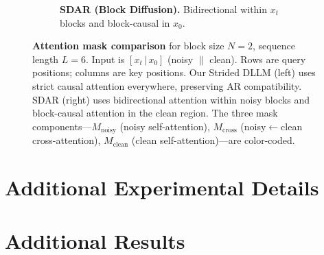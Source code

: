 \begin{figure}[t]
\begin{subfigure}[t]{0.48\textwidth}
\caption{\textbf{SDAR (Block Diffusion).} Bidirectional within $x_t$ blocks and block-causal in $x_0$.}
\label{fig:attn_mask_sdar}
\end{subfigure}
\caption{\textbf{Attention mask comparison} for block size $N{=}2$, sequence length $L{=}6$. Input is $[x_t \,|\, x_0]$ (noisy $\|$ clean). Rows are query positions; columns are key positions. Our Strided DLLM (left) uses strict causal attention everywhere, preserving AR compatibility. SDAR (right) uses bidirectional attention within noisy blocks and block-causal attention in the clean region. The three mask components---$M_\text{noisy}$ (noisy self-attention), $M_\text{cross}$ (noisy$\leftarrow$clean cross-attention), $M_\text{clean}$ (clean self-attention)---are color-coded.}
\label{fig:attn_mask}
\end{figure}

\section{Additional Experimental Details}
\label{app:details}

\section{Additional Results}
\label{app:results}
